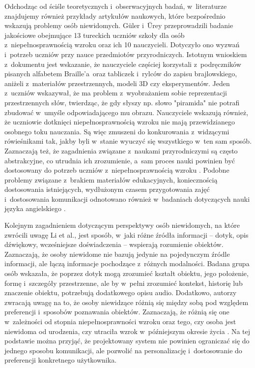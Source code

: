 Odchodząc od ściśle teoretycznych i~obserwacyjnych badań, w~literaturze znajdujemy również przykłady artykułów naukowych, które bezpośrednio wskazują problemy osób niewidomych. Güler i~Ürey przeprowadzili badanie jakościowe obejmujące 13 tureckich uczniów szkoły dla osób z~niepełnosprawnością wzroku oraz ich 10 nauczycieli. Dotyczyło ono wyzwań i~potrzeb uczniów przy nauce przedmiotów przyrodniczych. Istotnym wnioskiem z~dokumentu jest wskazanie, że nauczyciele częściej korzystali z~podręczników pisanych alfabetem Braille'a~oraz tabliczek i~rylców do zapisu brajlowskiego, aniżeli z~materiałów przestrzennych, modeli 3D czy eksperymentów. Jeden z~uczniów wskazywał, że ma problem z~wyobrażaniem sobie reprezentacji przestrzennych słów, twierdząc, że gdy słyszy np. słowo "piramida" nie potrafi zbudować w~umyśle odpowiadającego mu obrazu. Nauczyciele wskazują również, że uczniowie dotknięci niepełnosprawnością wzroku nie mają przewidzianego osobnego toku nauczania. Są więc zmuszeni do konkurowania z~widzącymi rówieśnikami tak, jakby byli w~stanie wyuczyć się wszystkiego w~ten sam sposób. Zaznaczają też, że zagadnienia związane z~naukami przyrodniczymi są często abstrakcyjne, co utrudnia ich zrozumienie, a~sam proces nauki powinien być dostosowany do potrzeb uczniów z~niepełnosprawnością wzroku \cite{bib:awareNeeds}. Podobne problemy związane z~brakiem materiałów edukacyjnych, koniecznością dostosowania istniejących, wydłużonym czasem przygotowania zajęć i~dostosowania komunikacji odnotowano również w~badaniach dotyczących nauki języka angielskiego \cite{bib:studentTeacherPerception}.

Kolejnym zagadnieniem dotyczącym perspektywy osób niewidomych, na które zwrócili uwagę Li et al., jest sposób, w~jaki różne źródła informacji -- dotyk, opis dźwiękowy, wcześniejsze doświadczenia -- wspierają rozumienie obiektów. Zaznaczają, że osoby niewidome nie bazują jedynie na pojedynczym źródle informacji, ale łączą informacje pochodzące z~różnych modalności. Badana grupa osób wskazała, że poprzez dotyk mogą zrozumieć kształt obiektu, jego położenie, formę i~szczegóły przestrzenne, ale by w~pełni zrozumieć kontekst, historię lub znaczenie obiektu, potrzebują dodatkowego opisu audio. Dodatkowo, autorzy zwracają uwagę na to, że osoby niewidzące różnią się między sobą pod względem preferencji i~sposobów poznawania obiektów. Zaznaczają, że różnią się one w~zależności od stopnia niepełnosprawności wzroku oraz tego, czy osoba jest niewidoma od urodzenia, czy utraciła wzrok w~późniejszym okresie życia \cite{bib:blindVisualArts}. Na tej podstawie można przyjąć, że projektowany system nie powinien ograniczać się do jednego sposobu komunikacji, ale pozwolić na personalizację i~dostosowanie do preferencji konkretnego użytkownika.

